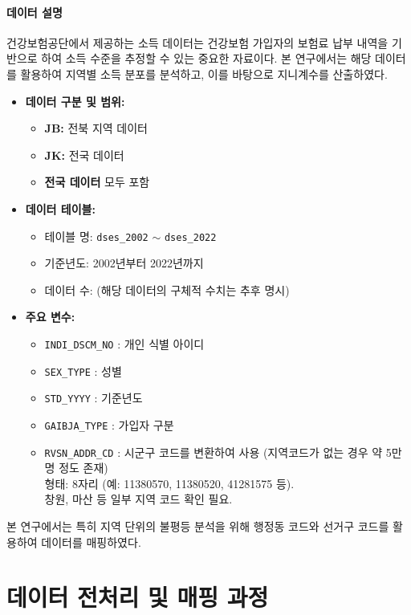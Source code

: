 \documentclass[a4paper,10pt]{article}
\begin{document}
\paragraph{데이터 설명}
건강보험공단에서 제공하는 소득 데이터는 건강보험 가입자의 보험료 납부 내역을 기반으로 하여 소득 수준을 추정할 수 있는 중요한 자료이다. 본 연구에서는 해당 데이터를 활용하여 지역별 소득 분포를 분석하고, 이를 바탕으로 지니계수를 산출하였다.
\begin{itemize}
    \item \textbf{데이터 구분 및 범위:}
    \begin{itemize}
        \item \textbf{JB:} 전북 지역 데이터
        \item \textbf{JK:} 전국 데이터
        \item \textbf{전국 데이터} 모두 포함
    \end{itemize}
    \item \textbf{데이터 테이블:}
    \begin{itemize}
        \item 테이블 명: \texttt{dses\_2002} $\sim$ \texttt{dses\_2022}
        \item 기준년도: 2002년부터 2022년까지
        \item 데이터 수: (해당 데이터의 구체적 수치는 추후 명시)
    \end{itemize}
    \item \textbf{주요 변수:}
    \begin{itemize}
        \item \texttt{INDI\_DSCM\_NO} : 개인 식별 아이디
        \item \texttt{SEX\_TYPE} : 성별
        \item \texttt{STD\_YYYY} : 기준년도
        \item \texttt{GAIBJA\_TYPE} : 가입자 구분
        \item \texttt{RVSN\_ADDR\_CD} : 시군구 코드를 변환하여 사용 (지역코드가 없는 경우 약 5만 명 정도 존재) \\
              \quad 형태: 8자리 (예: 11380570, 11380520, 41281575 등).\\
              \quad 창원, 마산 등 일부 지역 코드 확인 필요.
    \end{itemize}
\end{itemize}
본 연구에서는 특히 지역 단위의 불평등 분석을 위해 행정동 코드와 선거구 코드를 활용하여 데이터를 매핑하였다.

\newpage
\section{데이터 전처리 및 매핑 과정}
\end{document}

